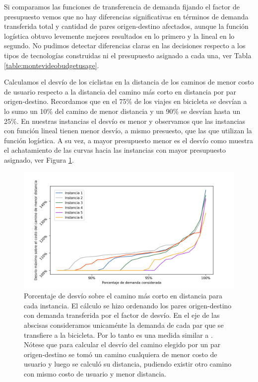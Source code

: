 \FloatBarrier
Si comparamos las funciones de transferencia de demanda fijando el factor de presupuesto vemos que no hay diferencias significativas en términos de demanda transferida total y cantidad de pares origen-destino afectados, aunque la función logística obtuvo levemente mejores resultados en lo primero y la lineal en lo segundo. No pudimos detectar diferencias claras en las decisiones respecto a los tipos de tecnologías construidas ni el presupuesto asignado a cada una, ver Tabla \ref{table:montevideobudgetusage}.

Calculamos el desvío de los ciclistas en la distancia de los caminos de menor costo de usuario respecto a la distancia del camino más corto en distancia por par origen-destino. Recordamos que en \textcite{winters2010} el 75\% de los viajes en bicicleta se desvían a lo sumo un 10\% del camino de menor distancia y un 90\% se desvían hasta un 25\%. En nuestras instancias el desvío es menor y observamos que las instancias con función lineal tienen menor desvío, a mismo presuesto, que las que utilizan la función logística. A su vez, a mayor presupuesto menor es el desvío como muestra el achatamiento de las curvas hacia las instancias con mayor presupuesto asignado, ver Figura \ref{fig:montevideoshortestpathdeviation}.

\begin{figure}[h!]
  \centering
  \includegraphics[width=\linewidth]{../resources/montevideo_shortest_path_distance_deviation.png}
    \caption{Porcentaje de desvío sobre el camino más corto en distancia para cada instancia. El cálculo se hizo ordenando los pares origen-destino con demanda transferida por el factor de desvío. En el eje de las abscisas consideramos unicaménte la demanda de cada par que se transfiere a la bicicleta. Por lo tanto es una medida similar a \textcite{winters2010}. Nótese que para calcular el desvío del camino elegido por un par origen-destino se tomó un camino cualquiera de menor costo de usuario y luego se calculó su distancia, pudiendo existir otro camino con mismo costo de usuario y menor distancia.}
  \label{fig:montevideoshortestpathdeviation}
\end{figure}

